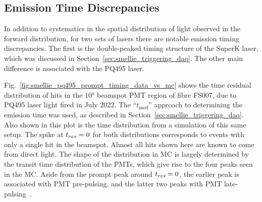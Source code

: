    
    
    
\subsection{Emission Time Discrepancies}
In addition to systematics in the spatial distribution of light observed in the forward distribution, for two sets of lasers there are notable emission timing discrepancies. The first is the double-peaked timing structure of the SuperK laser, which was discussed in Section~\ref{sec:smellie_triggering_daq}. The other main difference is associated with the PQ495 laser.

Fig.~\ref{fig:smellie_pq495_prompt_timing_data_vs_mc} shows the time residual distribution of hits in the \ang{10} beamspot PMT region of fibre FS007, due to PQ495 laser light fired in July 2022. The ``$t_{\mathrm{med}}$'' approach to determining the emission time was used, as described in Section~\ref{sec:smellie_triggering_daq}. Also shown in this plot is the time distribution from a simulation of this same setup. The spike at $t_{res}{} = 0$ for both distributions corresponds to events with only a single hit in the beamspot. Almost all hits shown here are known to come from direct light. The shape of the distribution in MC is largely determined by the transit time distribution of the PMTs, which give rise to the four peaks seen in the MC. Aside from the prompt peak around $t_{res}{} = 0$, the earlier peak is associated with PMT pre-pulsing, and the latter two peaks with PMT late-pulsing~\cite{andersonDevelopmentCharacterisationDeployment2021}. %

